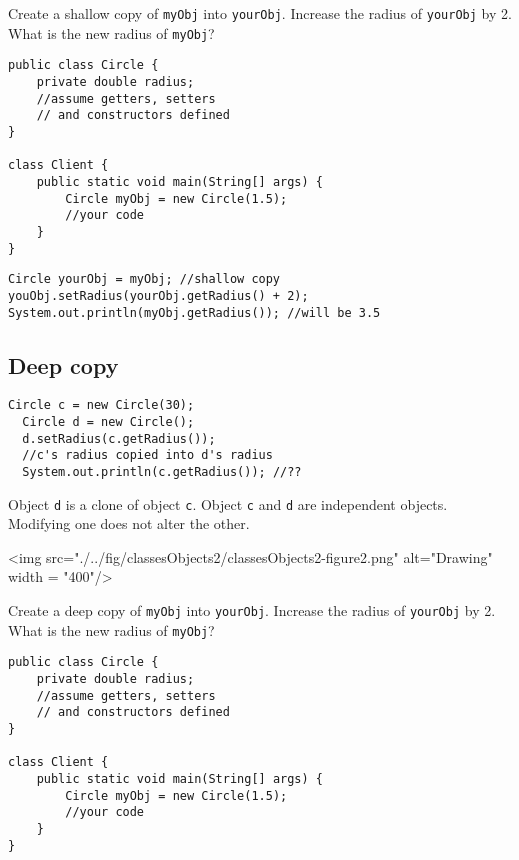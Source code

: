 \begin{exercise}
Create a shallow copy of \texttt{myObj} into \texttt{yourObj}. Increase the radius of \texttt{yourObj} by 2. What is the new radius of \texttt{myObj}?

\begin{lstlisting}[frame=single,style=buggy,backgroundcolor = \color{green!10!white}]
public class Circle {
	private double radius;
	//assume getters, setters 
	// and constructors defined
}

class Client {
	public static void main(String[] args) {
		Circle myObj = new Circle(1.5);
		//your code
	}
}
\end{lstlisting}  	
\end{exercise}
\begin{answer} \begin{lstlisting}
Circle yourObj = myObj; //shallow copy
youObj.setRadius(yourObj.getRadius() + 2);
System.out.println(myObj.getRadius()); //will be 3.5
\end{lstlisting} \end{answer}


\subsection{Deep copy}
  \begin{lstlisting}[style=correct,basicstyle=\footnotesize]
  Circle c = new Circle(30);
  Circle d = new Circle();
  d.setRadius(c.getRadius());
  //c's radius copied into d's radius
  System.out.println(c.getRadius()); //??
  \end{lstlisting}    
  
  Object \texttt{d} is a clone of object \texttt{c}. Object \texttt{c} and \texttt{d} are independent objects. Modifying one does not alter the other.

\begin{center}
<img src="./../fig/classesObjects2/classesObjects2-figure2.png" alt="Drawing" width = "400"/>
\end{center}

  
\begin{exercise}
Create a deep copy of \texttt{myObj} into \texttt{yourObj}. Increase the radius of \texttt{yourObj} by 2. What is the new radius of \texttt{myObj}?

\begin{lstlisting}[frame=single,style=buggy]
public class Circle {
	private double radius;
	//assume getters, setters
	// and constructors defined
}

class Client {
	public static void main(String[] args) {
		Circle myObj = new Circle(1.5);
		//your code
	}
}
\end{lstlisting}  	
\end{exercise}

